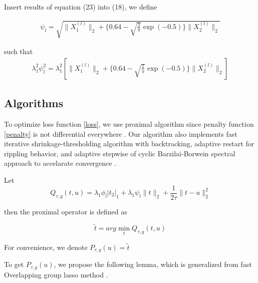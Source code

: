 \documentclass[12pt]{article}
\begin{document}
Insert results of equation (23) into (18), we define

\begin{equation}
  \begin{split}
\psi_l = \sqrt{\parallel X_1^{(l)} \parallel_2 + \{0.64 - \sqrt{\frac{2}{\pi}}\exp(-0.5) \} \parallel X_2^{(l)} \parallel_2} 
\end{split}
\end{equation}

such that
\begin{equation}
  \begin{split}
    \lambda_1^2\psi_l^2 = \lambda_1^2  [ \parallel X_1^{(l)} \parallel_2 + \{0.64 - \sqrt{\frac{2}{\pi}}\exp(-0.5) \} \parallel X_2^{(l)} \parallel_2 ]
  \end{split}
\end{equation}


\subsection{Algorithms}

To optimize loss function \ref{loss}, we use proximal algorithm since penalty function \ref{penalty}
is not differential everywhere \cite{liu2010fast}. Our algorithm also implements fast iterative shrinkage-thresholding algorithm with backtracking,
adaptive restart for rippling behavior, and adaptive stepwise of cyclic Barzilai-Borwein spectral approach
to accelarate convergence \cite{beck2009fast}\cite{o2015adaptive}\cite{wright2009sparse}.


Let 
\begin{equation}
Q_{\tau,g}(t,u)=\lambda_1\phi_l |t_2|_1 + \lambda_1\psi_l \parallel t \parallel_2  +\frac{1}{2\tau}\parallel t-u\parallel_2^2
\end{equation}

then the proximal operator is defined as 

\begin{equation}
\tilde{t}=arg\min_t Q_{\tau,g}(t,u)
\end{equation}

For convenience, we denote $P_{\tau,g}(u)=\tilde{t}$

To get $P_{\tau,g}(u)$, we propose the following lemma, which is generalized from fast Overlapping group lasso method \cite{liu2010fast}.
\end{document}
